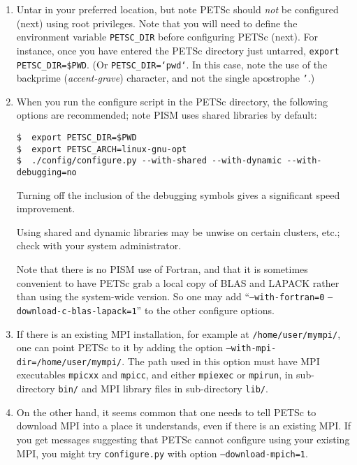 \documentclass[11pt,final]{amsart}
\newcommand{\und}{\_\!\_}
\begin{document}
\begin{enumerate}
\renewcommand{\labelenumii}{(\roman{enumii})}\begin{enumerate}
\item Untar in your preferred location, but note PETSc should \emph{not} be configured (next) using root privileges.  Note that you will need to define the environment variable \texttt{PETSC_DIR}\index{PETSC\und DIR} before configuring PETSc (next).  For instance, once you have entered the PETSc directory just untarred, \texttt{export PETSC_DIR=\$PWD}. (Or \texttt{PETSC_DIR=`pwd`}.  In this case, note the use of the backprime (\emph{accent-grave}) character, and not the single apostrophe \texttt{'}.)

\item When you run the configure script in the PETSc directory, the following options are recommended; note PISM uses shared libraries by default:\index{PETSC\und ARCH}
\begin{verbatim}
$  export PETSC_DIR=$PWD
$  export PETSC_ARCH=linux-gnu-opt
$  ./config/configure.py --with-shared --with-dynamic --with-debugging=no
\end{verbatim}

Turning off the inclusion of the debugging symbols gives a significant speed improvement.

Using shared and dynamic libraries may be unwise on certain clusters, etc.; check with your system administrator.

Note that there is no PISM use of Fortran, and that it is sometimes convenient to have PETSc grab a local copy of BLAS and LAPACK rather than using the system-wide version.  So one may add ``\texttt{--with-fortran=0} \texttt{--download-c-blas-lapack=1}'' to the other configure options.

\item If there is an existing MPI installation, for example at \texttt{/home/user/mympi/}, one can point PETSc to it by adding the option \texttt{--with-mpi-dir=/home/user/mympi/}.  The path used in this option must have MPI executables \texttt{mpicxx} and \texttt{mpicc}, and either \texttt{mpiexec} or \texttt{mpirun}, in sub-directory \texttt{bin/} and MPI library files in sub-directory \texttt{lib/}.

\item On the other hand, it seems common that one needs to tell PETSc to download MPI into a place it understands, even if there is an existing MPI.  If you get messages suggesting that PETSc cannot configure using your existing MPI, you might try \texttt{configure.py} with option \texttt{--download-mpich=1}.


\end{enumerate}
\end{enumerate}
\end{document}
